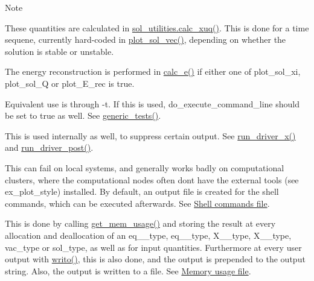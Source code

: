 \begin{DoxyNote}{Note}
\begin{DoxyEnumerate}
\item \label{page_inputs_fni26}%
%
These quantities are calculated in \hyperlink{interfacesol__utilities_1_1calc__xuq}{sol\+\_\+utilities.\+calc\+\_\+xuq()}. This is done for a time sequene, currently hard-\/coded in \hyperlink{namespacesol__ops_a13b3cf2fb6437a3c93256368fa91c267}{plot\+\_\+sol\+\_\+vec()}, depending on whether the solution is stable or unstable.
\item \label{page_inputs_fni27}%
%
The energy reconstruction is performed in \hyperlink{namespacesol__ops_ae094c2a5235324b4aadb53623978d191}{calc\+\_\+e()} if either one of {\ttfamily plot\+\_\+sol\+\_\+xi}, {\ttfamily plot\+\_\+sol\+\_\+Q} or {\ttfamily plot\+\_\+\+E\+\_\+rec} is true.
\item \label{page_inputs_fni28}%
%
Equivalent use is through {\ttfamily -\/t}. If this is used, {\ttfamily do\+\_\+execute\+\_\+command\+\_\+line} should be set to true as well. See \hyperlink{namespacetest_aca21ee464c0b1f4b617177afdde110ec}{generic\+\_\+tests()}.
\item \label{page_inputs_fni29}%
%
This is used internally as well, to suppress certain output. See \hyperlink{namespacedriver__x_ada3d72a0929daaa5e3da585246d62281}{run\+\_\+driver\+\_\+x()} and \hyperlink{namespacedriver__post_a33b3c6f9018a0ddc92dce77394b8ab37}{run\+\_\+driver\+\_\+post()}.
\item \label{page_inputs_fni30}%
%
This can fail on local systems, and generally works badly on computational clusters, where the computational nodes often don\textquotesingle{}t have the external tools (see {\ttfamily ex\+\_\+plot\+\_\+style}) installed. By default, an output file is created for the shell commands, which can be executed afterwards. See \hyperlink{page_outputs_output_file_shell}{Shell commands file}.
\item \label{page_inputs_fni31}%
%
This is done by calling \hyperlink{namespacemessages_a82dddaab795b78b3d39e1ff1aab2f665}{get\+\_\+mem\+\_\+usage()} and storing the result at every allocation and deallocation of an {\ttfamily eq\+\_\+\_\+type}, {\ttfamily eq\+\_\+\_\+type}, {\ttfamily X\+\_\+\_\+type}, {\ttfamily X\+\_\+\_\+type}, {\ttfamily vac\+\_\+type} or {\ttfamily sol\+\_\+type}, as well as for input quantities. Furthermore at every user output with \hyperlink{namespacemessages_aa4a8d01563e92558e8a0875b075ec54c}{writo()}, this is also done, and the output is prepended to the output string. Also, the output is written to a file. See \hyperlink{page_outputs_output_file_mem}{Memory usage file}.

\end{DoxyEnumerate}
\end{DoxyNote}
